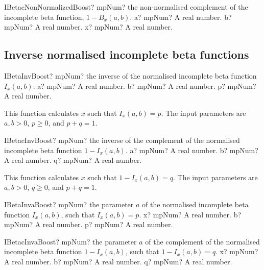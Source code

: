 \vspace{0.6cm}
\begin{mpFunctionsExtract}
	\mpFunctionThree
	{IBetacNonNormalizedBoost? mpNum? the non-normalised complement of the incomplete beta function, $1 - B_x(a,b)$.}
	{a? mpNum? A real number.}
	{b? mpNum? A real number.}
	{x? mpNum? A real number.}
\end{mpFunctionsExtract}



\subsection{Inverse normalised incomplete beta functions}


\begin{mpFunctionsExtract}
	\mpFunctionThree
	{IBetaInvBoost? mpNum? the inverse of the normalised incomplete beta function $I_x(a,b)$.}
	{a? mpNum? A real number.}
	{b? mpNum? A real number.}
	{p? mpNum? A real number.}
\end{mpFunctionsExtract}

\vspace{0.3cm}
This function calculates $x$ such that $I_x(a,b) = p$. The input parameters are $a, b>0$, $p \geq 0$,  and $p+q=1$. 

\vspace{0.6cm}
\begin{mpFunctionsExtract}
	\mpFunctionThree
	{IBetacInvBoost? mpNum? the inverse of the complement of the normalised incomplete beta function $1 - I_x(a,b)$.}
	{a? mpNum? A real number.}
	{b? mpNum? A real number.}
	{q? mpNum? A real number.}
\end{mpFunctionsExtract}


\vspace{0.3cm}
This function calculates $x$ such that $1 - I_x(a,b) = q$. The input parameters are $a, b>0$, $q \geq 0$, and $p+q=1$. 

\vspace{0.6cm}
\begin{mpFunctionsExtract}
	\mpFunctionThree
	{IBetaInvaBoost? mpNum? the parameter $a$ of the normalised incomplete beta function $I_x(a,b)$, such that $I_x(a,b) = p$.}
	{x? mpNum? A real number.}
	{b? mpNum? A real number.}
	{p? mpNum? A real number.}
\end{mpFunctionsExtract}


\vspace{0.6cm}
\begin{mpFunctionsExtract}
	\mpFunctionThree
	{IBetacInvaBoost? mpNum? the parameter $a$ of the complement of the normalised incomplete beta function $1-I_x(a,b)$, such that $1-I_x(a,b) = q$.}
	{x? mpNum? A real number.}
	{b? mpNum? A real number.}
	{q? mpNum? A real number.}
\end{mpFunctionsExtract}


